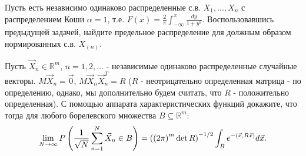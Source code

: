 \begin{problem}

Пусть есть независимо одинаково распределенные с.в. $X_{1} ,...,X_{n} $ с распределением Коши $\alpha =1$, т.е. $F\left(x\right)=\frac{2}{\pi } \int _{-\infty }^{x}\frac{dy}{1+y^{2} }  $. Воспользовавшись предыдущей задачей, найдите предельное распределение для должным образом нормированных с.в. $X_{\left(n\right)} $.

\end{problem}

\begin{problem}
Пусть $\vec{X}_{n} \in {\mathbb R}^{m} $, $n=1,2,...$ - независимые одинаково распределенные случайные векторы. $M\vec{X}_{n} =\vec{0}$, $M\vec{X}_{n} \vec{X}_{n}^{T} =R$ ($R$ - неотрицательно определенная матрица - по определению, однако, мы дополнительно будем считать, что $R$ - положительно определенная). С помощью аппарата характеристических функций докажите, что тогда для любого борелевского множества $B\subseteq {\mathbb R}^{m} $:
\[\mathop{\lim }\limits_{N\to \infty } P\left(\frac{1}{\sqrt{N} } \sum _{n=1}^{N}\vec{X}_{n}  \in B\right)=\left(\left(2\pi \right)^{m} \det R\right)^{-{1\mathord{\left/ {\vphantom {1 2}} \right. \kern-\nulldelimiterspace} 2} } \int _{B}e^{-\left(\vec{x},R\vec{x}\right)} d\vec{x} .\] 

\end{problem}

\begin{problem}
\end{problem}

\begin{problem}
\end{problem}


\begin{problem}
\end{problem}

\begin{problem}
\end{problem}


\begin{problem}
\end{problem}